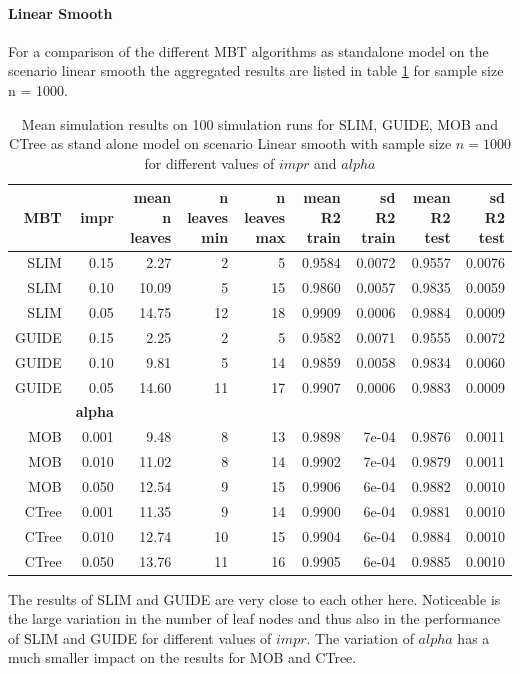 \paragraph{Linear Smooth}
For a comparison of the different MBT algorithms as standalone model on the scenario linear smooth the aggregated results are listed in table \ref{tab:linear_smooth_summary} for sample size n = 1000. 
\begin{table} \label{tab:linear_smooth_summary}
\caption{Mean simulation results on 100 simulation runs for SLIM, GUIDE, MOB and CTree as stand alone model on scenario Linear smooth with sample size $n = 1000$ for different values of $impr$ and $alpha$}
\centering \tiny
\begin{tabular}[t]{r|r|r|r|r|r|r|r|r}
\hline
MBT & \textbf{impr} & mean n leaves & n leaves min & n leaves max & mean R2 train & sd R2 train & mean R2 test & sd R2 test\\
\hline
SLIM & 0.15 & 2.27 & 2 & 5 & 0.9584 & 0.0072 & 0.9557 & 0.0076\\
SLIM & 0.10 & 10.09 & 5 & 15 & 0.9860 & 0.0057 & 0.9835 & 0.0059\\
SLIM & 0.05 & 14.75 & 12 & 18 & 0.9909 & 0.0006 & 0.9884 & 0.0009\\
GUIDE & 0.15 & 2.25 & 2 & 5 & 0.9582 & 0.0071 & 0.9555 & 0.0072\\
GUIDE & 0.10 & 9.81 & 5 & 14 & 0.9859 & 0.0058 & 0.9834 & 0.0060\\
GUIDE & 0.05 & 14.60 & 11 & 17 & 0.9907 & 0.0006 & 0.9883 & 0.0009\\
\hline
 & \textbf{alpha} &  &  &  &  &  &  & \\
\hline
MOB & 0.001 & 9.48 & 8 & 13 & 0.9898 & 7e-04 & 0.9876 & 0.0011\\
MOB & 0.010 & 11.02 & 8 & 14 & 0.9902 & 7e-04 & 0.9879 & 0.0011\\
MOB & 0.050 & 12.54 & 9 & 15 & 0.9906 & 6e-04 & 0.9882 & 0.0010\\
CTree & 0.001 & 11.35 & 9 & 14 & 0.9900 & 6e-04 & 0.9881 & 0.0010\\
CTree & 0.010 & 12.74 & 10 & 15 & 0.9904 & 6e-04 & 0.9884 & 0.0010\\
CTree & 0.050 & 13.76 & 11 & 16 & 0.9905 & 6e-04 & 0.9885 & 0.0010\\
\hline
\end{tabular}
\end{table}
The results of SLIM and GUIDE are very close to each other here. Noticeable is the large variation in the number of leaf nodes and thus also in the performance of SLIM and GUIDE for different values of $impr$. The variation of $alpha$ has a much smaller impact on the results for MOB and CTree.

